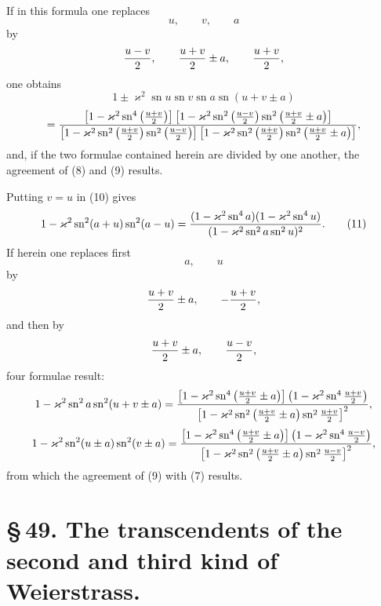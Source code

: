 \documentclass[11pt]{article}
\providecommand{\sn}{\operatorname{sn}}
\begin{document}
If in this formula one replaces
\[
 u,
 \qquad v,
 \qquad a
\]
by
\[
{u-v\over2},
\qquad {u+v\over2}\pm a,
\qquad {u+v\over2},
\]
one obtains
\[
1\pm\varkappa^2\sn u\sn v\sn a\sn(u+v\pm a)
\]
\[
={\left[1-\varkappa^2\sn^4\left({u+v\over2}\right)\right]
\left[1-\varkappa^2\sn^2\left({u-v\over2}\right)
\sn^2\left({u+v\over2}\pm a\right)\right]
\over
\left[1-\varkappa^2\sn^2\left({u+v\over2}\right)
\sn^2\left({u-v\over2}\right)\right]
\left[1-\varkappa^2\sn^2\left({u+v\over2}\right)
\sn^2\left({u+v\over2}\pm a\right)\right]},
\]
and, if the two formulae contained herein are divided by one another, the agreement of (8) and (9) results.

Putting $v=u$ in (10) gives
\begin{equation}
1-\varkappa^2\sn^2(a+u)\sn^2(a-u)
={(1-\varkappa^2\sn^4a)(1-\varkappa^2\sn^4u)
\over(1-\varkappa^2\sn^2a\sn^2u)^2}.
\tag{11}
\end{equation}
If herein one replaces first
\[
 a,
 \qquad u
\]
by
\[
{u+v\over2}\pm a,
\qquad -{u+v\over2},
\]
and then by
\[
{u+v\over2}\pm a,
\qquad {u-v\over2},
\]
four formulae result:
\[
1-\varkappa^2\sn^2a\sn^2(u+v\pm a)
={\left[1-\varkappa^2\sn^4\left({u+v\over2}\pm a\right)\right]
\left(1-\varkappa^2\sn^4{u+v\over2}\right)
\over
\left[1-\varkappa^2\sn^2\left({u+v\over2}\pm a\right)\sn^2{u+v\over2}\right]^2},
\]
\[
1-\varkappa^2\sn^2(u\pm a)\sn^2(v\pm a)
={\left[1-\varkappa^2\sn^4\left({u+v\over2}\pm a\right)\right]
\left(1-\varkappa^2\sn^4{u-v\over2}\right)
\over
\left[1-\varkappa^2\sn^2\left({u+v\over2}\pm a\right)\sn^2{u-v\over2}\right]^2},
\]
from which the agreement of (9) with (7) results.

\section*{\S\,49. The transcendents of the second and third kind of Weierstrass.}
\end{document}

